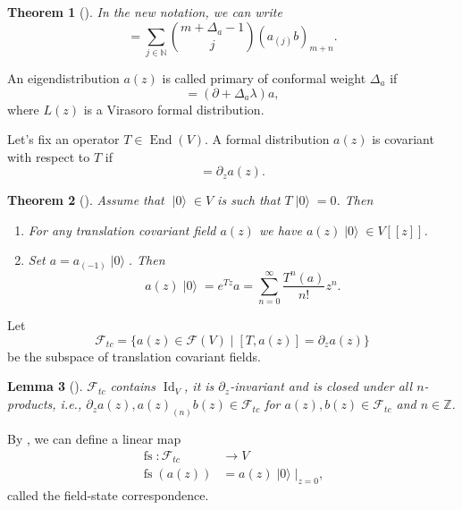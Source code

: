 \documentclass[a4paper, 12pt, reqno]{amsart}
\newtheorem{theorem}{Theorem}[subsection]
\newtheorem{lemma}[theorem]{Lemma}
\theoremstyle{remark}
\numberwithin{equation}{subsection}
\DeclareMathOperator{\Id}{Id}
\DeclareMathOperator{\End}{End}
\DeclareMathOperator{\vac}{|0\rangle}
\DeclareMathOperator{\fs}{fs}
\begin{document}
\begin{theorem}[{\cite[Proposition 3.7.6]{nozaradan_introduction_2008}}]
  \label{thr:9}
  In the new notation, we can write
  \begin{equation*}
    [a_m, b_n] = \sum_{j \in \mathbb{N}}\binom{m + \Delta_a - 1}{j}(a_{(j)}b)_{m + n}.
  \end{equation*}
\end{theorem}

An eigendistribution $a(z)$ is called primary of conformal weight $\Delta_a$ if
\begin{equation*}
  [L_\lambda a]=(\partial +\Delta_a\lambda)a,
\end{equation*}
where $L(z)$ is a Virasoro formal distribution.

Let's fix an operator $T\in \End(V)$.
A formal distribution $a(z)$ is covariant with respect to $T$ if
\begin{equation*}
  [T, a(z)] = \partial_za(z).
\end{equation*}

\begin{theorem}[{\cite[Lemma 1]{callegaro_introduction_2017}}]
  \label{thr:10}
  Assume that $\vac \in V$ is such that $T\vac = 0$.
  Then
  \begin{enumerate}
  \item For any translation covariant field $a(z)$ we have $a(z)\vac \in V[[z]]$.
  \item Set $a = a_{(-1)}\vac$.
    Then
    \begin{equation*}
      a(z)\vac = e^{Tz}a = \sum_{n = 0}^\infty\frac{T^n(a)}{n!}z^n.
    \end{equation*}
  \end{enumerate}
\end{theorem}

Let
\begin{equation*}
  \mathcal{F}_{tc} = \{a(z) \in \mathcal{F}(V) \mid [T, a(z)] = \partial_za(z)\}
\end{equation*}
be the subspace of translation covariant fields.

\begin{lemma}[{\cite[Lemma 3]{callegaro_introduction_2017}}]
  \label{lmm:3}
  $\mathcal{F}_{tc}$ contains $\Id_V$, it is $\partial_z$-invariant and is closed under all $n$-products, i.e., $\partial_za(z), a(z)_{(n)}b(z) \in \mathcal{F}_{tc}$ for $a(z), b(z) \in \mathcal{F}_{tc}$ and $n \in \mathbb{Z}$.
\end{lemma}

By , we can define a linear map
\begin{align*}
  \fs: \mathcal{F}_{tc} &\to V \\
  \fs(a(z)) &= a(z)\vac|_{z = 0},
\end{align*}
called the field-state correspondence.
\end{document}
